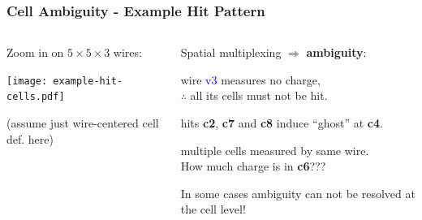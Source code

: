 \documentclass[xcolor=dvipsnames]{beamer}
\begin{document}
\begin{frame}
  \frametitle{Cell Ambiguity - Example Hit Pattern}

  \begin{columns}
    \begin{column}{0.35\textwidth}
      \begin{center}
        \scriptsize Zoom in on $5 \times 5 \times 3$ wires:

        \texttt{[image: example-hit-cells.pdf]}        

        \tiny (assume just wire-centered cell def. here)
      \end{center}
    \end{column}
    \begin{column}{0.65\textwidth}

      Spatial multiplexing $\Rightarrow$ \textbf{ambiguity}:

      \vspace{5mm}

      \begin{description}\scriptsize
      \item[Good] wire \textcolor{blue}{v3} measures no charge, \\$\therefore$ all its cells must not be hit.
      \item[Bad] hits \textbf{c2}, \textbf{c7} and \textbf{c8} induce ``ghost'' at \textbf{c4}.
      \item[Ambiguous] multiple cells measured by same wire.\\
        How much charge is in \textbf{c6}???
      \end{description}

      \vspace{5mm}

      In some cases ambiguity can not be resolved at the cell level!

    \end{column}
  \end{columns}
\end{frame}
\end{document}
